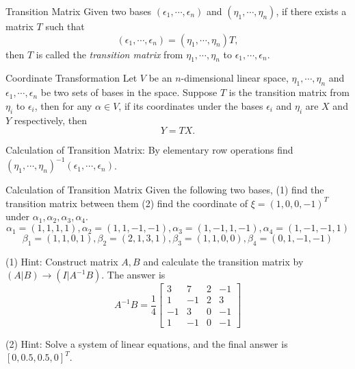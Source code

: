 \begin{definition}{Transition Matrix}{}
  Given two bases $(\epsilon_1, \cdots, \epsilon_n)$
  and $(\eta_1, \cdots, \eta_n)$, if there exists a matrix $T$ such that
  \begin{equation}
    (\epsilon_1, \cdots, \epsilon_n) = (\eta_1, \cdots, \eta_n)T,
  \end{equation}
  then $T$ is called the \emph{transition matrix} from $\eta_1, \cdots, \eta_n$
  to $\epsilon_1, \cdots, \epsilon_n$.
\end{definition}

\begin{proposition}{Coordinate Transformation}{}
  Let $V$ be an $n$-dimensional linear space, $\eta_1,\cdots,\eta_n$ and
  $\epsilon_1,\cdots, \epsilon_n$ be two sets of bases in the space.
  Suppose $T$ is the transition matrix from $\eta_i$ to $\epsilon_i$,
  then for any $\alpha \in V$, if its coordinates under the bases $\epsilon_i$
  and $\eta_i$ are $X$ and $Y$ respectively, then
  \begin{equation}
    Y = TX.
  \end{equation}
\end{proposition}

\begin{note}{}
  Calculation of Transition Matrix:
  By elementary row operations find $(\eta_1, \cdots, \eta_n)^{-1} (\epsilon_1,
  \cdots, \epsilon_n)$.
\end{note}

\begin{example}{Calculation of Transition Matrix}{}
  Given the following two bases, (1) find the transition matrix between them
  (2) find the coordinate of $\xi = (1, 0, 0, -1)^T$ under $\alpha_1, \alpha_2,
  \alpha_3, \alpha_4$.
  \begin{equation}
    \alpha_1=(1,1,1,1),\alpha_2=(1,1,-1,-1),\alpha_3=(1,-1,1,-1),\alpha_4=(1,-1,-1,1)
  \end{equation}
  \begin{equation}
    \beta_1=(1,1,0,1),\beta_2=(2,1,3,1),\beta_3=(1,1,0,0),\beta_4=(0,1,-1,-1)
  \end{equation}
\end{example}

\begin{solution}
  (1) Hint: Construct matrix $A, B$ and calculate the transition matrix by
  $(A|B) \rightarrow (I|A^{-1}B)$. The answer is
  \begin{equation}
    A^{-1}B=\frac{1}{4}\left[\begin{array}{cccc}3&7&2&-1\\1&-1&2&3\\-1&3&0&-1\\1&-1&0&-1\end{array}\right]
  \end{equation}

  (2) Hint: Solve a system of linear equations, and the final answer is $[0,
  0.5, 0.5, 0]^T$.
\end{solution}

